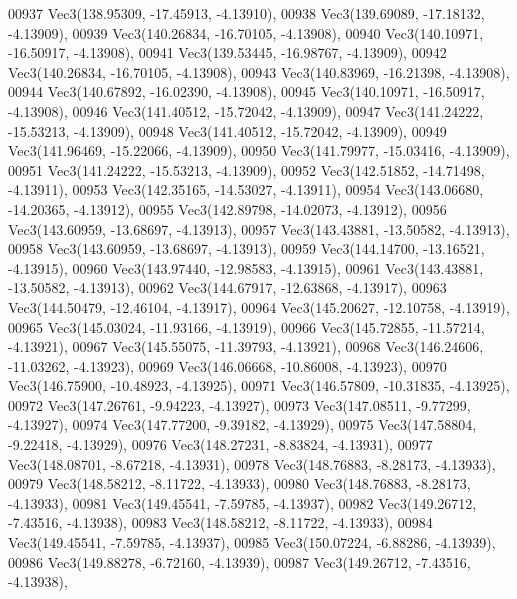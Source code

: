 \begin{DoxyCode}
00937         Vec3(138.95309, -17.45913, -4.13910),
00938         Vec3(139.69089, -17.18132, -4.13909),
00939         Vec3(140.26834, -16.70105, -4.13908),
00940         Vec3(140.10971, -16.50917, -4.13908),
00941         Vec3(139.53445, -16.98767, -4.13909),
00942         Vec3(140.26834, -16.70105, -4.13908),
00943         Vec3(140.83969, -16.21398, -4.13908),
00944         Vec3(140.67892, -16.02390, -4.13908),
00945         Vec3(140.10971, -16.50917, -4.13908),
00946         Vec3(141.40512, -15.72042, -4.13909),
00947         Vec3(141.24222, -15.53213, -4.13909),
00948         Vec3(141.40512, -15.72042, -4.13909),
00949         Vec3(141.96469, -15.22066, -4.13909),
00950         Vec3(141.79977, -15.03416, -4.13909),
00951         Vec3(141.24222, -15.53213, -4.13909),
00952         Vec3(142.51852, -14.71498, -4.13911),
00953         Vec3(142.35165, -14.53027, -4.13911),
00954         Vec3(143.06680, -14.20365, -4.13912),
00955         Vec3(142.89798, -14.02073, -4.13912),
00956         Vec3(143.60959, -13.68697, -4.13913),
00957         Vec3(143.43881, -13.50582, -4.13913),
00958         Vec3(143.60959, -13.68697, -4.13913),
00959         Vec3(144.14700, -13.16521, -4.13915),
00960         Vec3(143.97440, -12.98583, -4.13915),
00961         Vec3(143.43881, -13.50582, -4.13913),
00962         Vec3(144.67917, -12.63868, -4.13917),
00963         Vec3(144.50479, -12.46104, -4.13917),
00964         Vec3(145.20627, -12.10758, -4.13919),
00965         Vec3(145.03024, -11.93166, -4.13919),
00966         Vec3(145.72855, -11.57214, -4.13921),
00967         Vec3(145.55075, -11.39793, -4.13921),
00968         Vec3(146.24606, -11.03262, -4.13923),
00969         Vec3(146.06668, -10.86008, -4.13923),
00970         Vec3(146.75900, -10.48923, -4.13925),
00971         Vec3(146.57809, -10.31835, -4.13925),
00972         Vec3(147.26761, -9.94223, -4.13927),
00973         Vec3(147.08511, -9.77299, -4.13927),
00974         Vec3(147.77200, -9.39182, -4.13929),
00975         Vec3(147.58804, -9.22418, -4.13929),
00976         Vec3(148.27231, -8.83824, -4.13931),
00977         Vec3(148.08701, -8.67218, -4.13931),
00978         Vec3(148.76883, -8.28173, -4.13933),
00979         Vec3(148.58212, -8.11722, -4.13933),
00980         Vec3(148.76883, -8.28173, -4.13933),
00981         Vec3(149.45541, -7.59785, -4.13937),
00982         Vec3(149.26712, -7.43516, -4.13938),
00983         Vec3(148.58212, -8.11722, -4.13933),
00984         Vec3(149.45541, -7.59785, -4.13937),
00985         Vec3(150.07224, -6.88286, -4.13939),
00986         Vec3(149.88278, -6.72160, -4.13939),
00987         Vec3(149.26712, -7.43516, -4.13938),

\end{DoxyCode}
